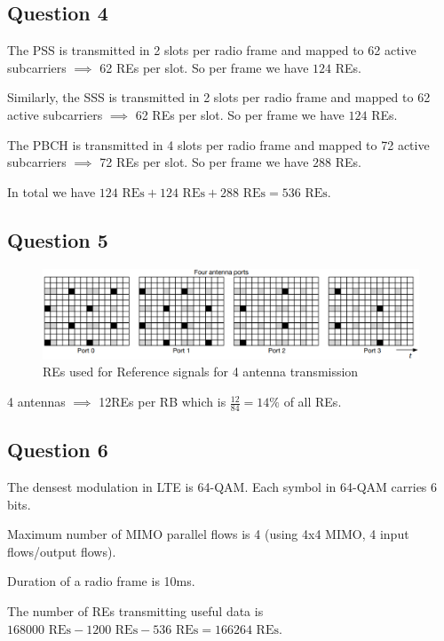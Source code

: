 \documentclass[]{article}
\begin{document}
	\subsection*{Question 4}
	
	The PSS is transmitted in 2 slots per radio frame and mapped to 62 active subcarriers $\implies$ 62 REs per slot. So per frame we have $124$ REs.
	
	Similarly, the SSS is transmitted in 2 slots per radio frame and mapped to 62 active subcarriers $\implies$ 62 REs per slot. So per frame we have $124$ REs.
	
	The PBCH is transmitted in 4 slots per radio frame and mapped to 72 active subcarriers $\implies$ 72 REs per slot. So per frame we have $288$ REs.
	
	In total we have $124 \text{ REs} + 124 \text{ REs} + 288 \text{ REs} = 536 \text{ REs}$.
	
	\subsection*{Question 5}
	
	\begin{figure}[h!]
		\centering
		\includegraphics[scale=0.5]{ReferenceSignalsQuestion5.PNG}
		\caption{REs used for Reference signals for 4 antenna transmission}
	\end{figure}
	
	4 antennas $\implies$ 12REs per RB which is $\frac{12}{84} = 14\%$ of all REs.
	
	\subsection*{Question 6}
	
	The densest modulation in LTE is 64-QAM. Each symbol in 64-QAM carries 6 bits.
	
	Maximum number of MIMO parallel flows is 4 (using 4x4 MIMO, 4 input flows/output flows).
	
	Duration of a radio frame is 10ms.
	
	The number of REs transmitting useful data is $168000 \text{ REs} - 1200 \text{ REs} - 536 \text{ REs} = 166264 \text{ REs}$.
	
\end{document}
